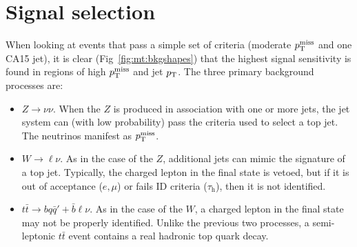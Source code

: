 \clearpage

\section{Signal selection}
\label{sec:mt:sel}

When looking at events that pass a simple set of criteria (moderate $p_\mathrm{T}^\mathrm{miss}$ and one CA15 jet), it is clear (Fig~\ref{fig:mt:bkgshapes}) that the highest signal sensitivity is found in regions of high $p_\mathrm{T}^\mathrm{miss}$ and jet $p_\mathrm{T}$.
The three primary background processes are:
\begin{itemize}
    \item $Z\rightarrow\nu\nu$. When the $Z$ is produced in association with one or more jets, the jet system can (with low probability) pass the criteria used to select a top jet. The neutrinos manifest as $p_\mathrm{T}^\mathrm{miss}$.
    \item $W\rightarrow\ell\nu$. As in the case of the $Z$, additional jets can mimic the signature of a top jet. Typically, the charged lepton in the final state is vetoed, but if it is out of acceptance ($e,\mu$) or fails ID criteria ($\tau_\mathrm{h}$), then it is not identified. 
    \item $t\bar{t} \rightarrow bq\bar{q}' + \bar{b}\ell\nu$. As in the case of the $W$, a charged lepton in the final state may not be properly identified. Unlike the previous two processes, a semi-leptonic $t\bar{t}$ event contains a real hadronic top quark decay. 
\end{itemize}

